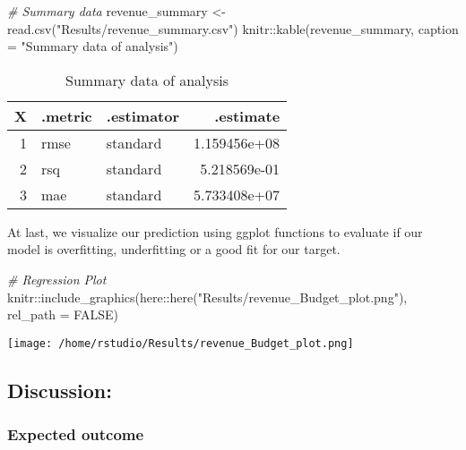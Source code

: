 \documentclass[
]{article}
\newenvironment{Shaded}{\begin{snugshade}}{\end{snugshade}}
\newcommand{\AttributeTok}[1]{\textcolor[rgb]{0.77,0.63,0.00}{#1}}
\newcommand{\CommentTok}[1]{\textcolor[rgb]{0.56,0.35,0.01}{\textit{#1}}}
\newcommand{\ConstantTok}[1]{\textcolor[rgb]{0.00,0.00,0.00}{#1}}
\newcommand{\FunctionTok}[1]{\textcolor[rgb]{0.00,0.00,0.00}{#1}}
\newcommand{\NormalTok}[1]{#1}
\newcommand{\OtherTok}[1]{\textcolor[rgb]{0.56,0.35,0.01}{#1}}
\newcommand{\SpecialCharTok}[1]{\textcolor[rgb]{0.00,0.00,0.00}{#1}}
\newcommand{\StringTok}[1]{\textcolor[rgb]{0.31,0.60,0.02}{#1}}
\begin{document}
\begin{Shaded}
\begin{Highlighting}[]
\CommentTok{\# Summary data}
\NormalTok{revenue\_summary }\OtherTok{\textless{}{-}} \FunctionTok{read.csv}\NormalTok{(}\StringTok{"Results/revenue\_summary.csv"}\NormalTok{)}
\NormalTok{knitr}\SpecialCharTok{::}\FunctionTok{kable}\NormalTok{(revenue\_summary, }\AttributeTok{caption =} \StringTok{"Summary data of analysis"}\NormalTok{) }
\end{Highlighting}
\end{Shaded}

\begin{table}

\caption{\label{tab:unnamed-chunk-8}Summary data of analysis}
\centering
\begin{tabular}[t]{r|l|l|r}
\hline
X & .metric & .estimator & .estimate\\
\hline
1 & rmse & standard & 1.159456e+08\\
\hline
2 & rsq & standard & 5.218569e-01\\
\hline
3 & mae & standard & 5.733408e+07\\
\hline
\end{tabular}
\end{table}

At last, we visualize our prediction using ggplot functions to evaluate if our model is overfitting, underfitting or a good fit for our target.

\begin{Shaded}
\begin{Highlighting}[]
\CommentTok{\# Regression Plot}
\NormalTok{knitr}\SpecialCharTok{::}\FunctionTok{include\_graphics}\NormalTok{(here}\SpecialCharTok{::}\FunctionTok{here}\NormalTok{(}\StringTok{"Results/revenue\_Budget\_plot.png"}\NormalTok{), }\AttributeTok{rel\_path =} \ConstantTok{FALSE}\NormalTok{)}
\end{Highlighting}
\end{Shaded}

\texttt{[image: /home/rstudio/Results/revenue\_Budget\_plot.png]}

\hypertarget{discussion}{%
\subsection{Discussion:}\label{discussion}}

\hypertarget{expected-outcome}{%
\subsubsection{Expected outcome}\label{expected-outcome}}
\end{document}
